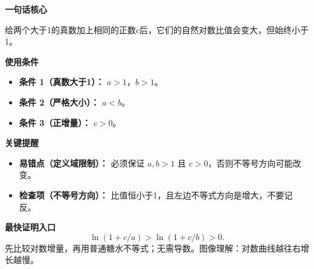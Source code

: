 \begin{summarybox}
	\textbf{\textcolor{CSummary}{一句话核心}}

	给两个大于1的真数加上相同的正数$c$后，它们的自然对数比值会变大，但始终小于1。

	\medskip
	\textbf{\textcolor{CSummary}{使用条件}}
	\begin{itemize}[leftmargin=*, itemsep=0.5em, topsep=0.4em]
		\item \textbf{条件 1（真数大于1）：} $a>1$，$b>1$。
		\item \textbf{条件 2（严格大小）：} $a<b$。
		\item \textbf{条件 3（正增量）：} $c>0$。
	\end{itemize}

	\medskip
	\textbf{\textcolor{CSummary}{关键提醒}}
	\begin{itemize}[leftmargin=*, itemsep=0.5em, topsep=0.4em]
		\item \textbf{易错点（定义域限制）：} 必须保证 $a,b>1$ 且 $c>0$，否则不等号方向可能改变。
		\item \textbf{检查项（不等号方向）：} 比值恒小于1，且左边不等式方向是增大，不要记反。
	\end{itemize}
\medskip
\textbf{\textcolor{CSummary}{最快证明入口}}
\[
\ln(1+c/a)>\ln(1+c/b)>0.
\]
先比较对数增量，再用普通糖水不等式；无需导数。图像理解：对数曲线越往右增长越慢。
\end{summarybox}
